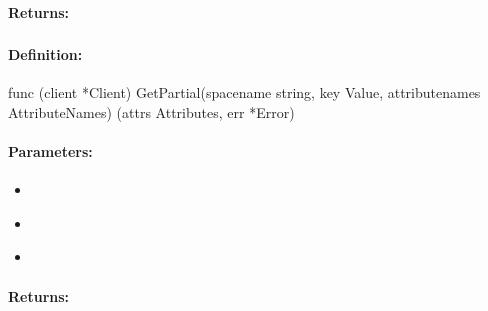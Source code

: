 \paragraph{Returns:}


\pagebreak
\subsubsection{}
\label{api:Go:GetPartial}


\paragraph{Definition:}
\begin{gocode}
func (client *Client) GetPartial(spacename string, key Value, attributenames AttributeNames) (attrs Attributes, err *Error)
\end{gocode}

\paragraph{Parameters:}
\begin{itemize}[noitemsep]
\item {}\\

\item {}\\

\item {}\\

\end{itemize}

\paragraph{Returns:}


\pagebreak
\subsubsection{}
\label{api:Go:Put}


